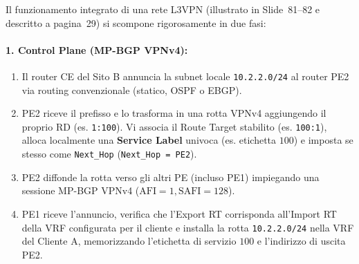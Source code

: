 \documentclass[11pt, a4paper]{article}
\begin{document}
Il funzionamento integrato di una rete L3VPN (illustrato in Slide~81--82 e descritto a pagina~29) si scompone rigorosamente in due fasi:

\paragraph{1. Control Plane (MP-BGP VPNv4):}
\begin{enumerate}[noitemsep]
    \item Il router CE del Sito B annuncia la subnet locale \texttt{10.2.2.0/24} al router PE2 via routing convenzionale (statico, OSPF o EBGP).
    \item PE2 riceve il prefisso e lo trasforma in una rotta VPNv4 aggiungendo il proprio RD (es. \texttt{1:100}). Vi associa il Route Target stabilito (es. \texttt{100:1}), alloca localmente una \textbf{Service Label} univoca (es. etichetta $100$) e imposta se stesso come \texttt{Next\_Hop} (\texttt{Next\_Hop = PE2}).
    \item PE2 diffonde la rotta verso gli altri PE (incluso PE1) impiegando una sessione MP-BGP VPNv4 ($\text{AFI}=1, \text{SAFI}=128$).
    \item PE1 riceve l'annuncio, verifica che l'Export RT corrisponda all'Import RT della VRF configurata per il cliente e installa la rotta \texttt{10.2.2.0/24} nella VRF del Cliente A, memorizzando l'etichetta di servizio $100$ e l'indirizzo di uscita PE2.
\end{enumerate}
\end{document}
